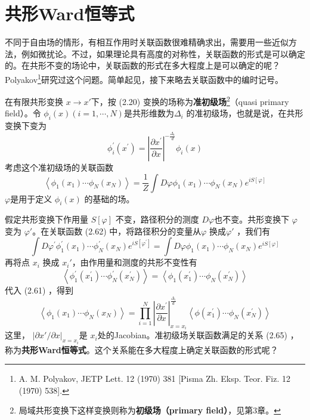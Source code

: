 \section{共形Ward恒等式}
不同于自由场的情形，有相互作用时关联函数很难精确求出，需要用一些近似方法，例如微扰论。不过，如果理论具有高度的对称性，关联函数的形式是可以确定的。在共形不变的场论中，关联函数的形式在多大程度上是可以确定的呢？Polyakov\footnote{A. M. Polyakov, JETP Lett. 12 (1970) 381 [Pisma Zh. Eksp. Teor. Fiz. 12 (1970) 538].}研究过这个问题。简单起见，接下来略去关联函数中的编时记号。

在有限共形变换 $x\to x' $下，按 (2.20) 变换的场称为\textbf{准初级场}\footnote{局域共形变换下这样变换则称为\textbf{初级场（primary field）}，见第3章。}（quasi primary field）。令 $\phi_i(x) (i=1,\cdots,N )$是共形维数为$ \Delta_i$ 的准初级场，也就是说，在共形变换下变为
\begin{equation}
	\phi_{i}^{\prime}\left(x^{\prime}\right)=\left|\frac{\partial x^{\prime}}{\partial x}\right|^{-\frac{\Delta_{i}}{d}} \phi_{i}(x)
\end{equation}
考虑这个准初级场的关联函数
\begin{equation}
	\left\langle\phi_{1}\left(x_{1}\right) \cdots \phi_{N}\left(x_{N}\right)\right\rangle=\frac{1}{Z} \int D \varphi \phi_{1}\left(x_{1}\right) \cdots \phi_{N}\left(x_{N}\right) e^{i S[\varphi]}
\end{equation}
$\varphi $是用于定义 $\phi_i(x)$ 的基础的场。

假定共形变换下作用量 $S[\varphi]$ 不变，路径积分的测度 $D\varphi $也不变。共形变换下 $\varphi$ 变为 $\varphi' $。在关联函数 (2.62) 中，将路径积分的变量从$ \varphi$ 换成$ \varphi'$ ，我们有
\begin{equation}
	\int D \varphi^{\prime} \phi_{1}^{\prime}\left(x_{1}\right) \cdots \phi_{N}^{\prime}\left(x_{N}\right) e^{i S\left[\varphi^{\prime}\right]}=\int D \varphi \phi_{1}\left(x_{1}\right) \cdots \phi_{N}\left(x_{N}\right) e^{i S[\varphi]}
\end{equation}
再将点 $x_i$ 换成 $x_i' $，由作用量和测度的共形不变性有
\begin{equation}
	\left\langle\phi_{1}^{\prime}\left(x_{1}^{\prime}\right) \cdots \phi_{N}^{\prime}\left(x_{N}^{\prime}\right)\right\rangle=\left\langle\phi_{1}\left(x_{1}^{\prime}\right) \cdots \phi_{N}\left(x_{N}^{\prime}\right)\right\rangle
\end{equation}
代入 (2.61) ，得到
\begin{equation}
	\left\langle\phi_1\left(x_{1}\right) \cdots \phi_{N}\left(x_{N}\right)\right\rangle=\prod_{i=1}^{N}\left|\frac{\partial x^{\prime}}{\partial x}\right|_{x=x_{i}}^{\frac{\Delta_{i}}{d}}\left\langle\phi\left(x_{1}^{\prime}\right) \cdots \phi_{N}\left(x_{N}^{\prime}\right)\right\rangle
\end{equation}
这里， $|\partial x'/\partial x|_{x=x_i} $是 $x_i $处的Jacobian。准初级场关联函数满足的关系 (2.65) ，称为\textbf{共形Ward恒等式}。这个关系能在多大程度上确定关联函数的形式呢？

